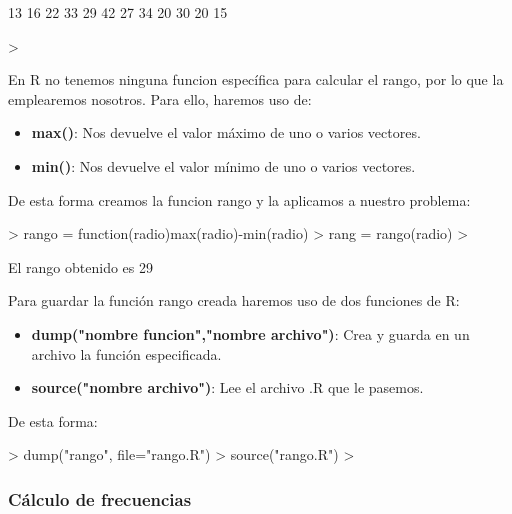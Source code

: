 \documentclass [a4paper] {article}
\begin{document}
\begin{Schunk}
\begin{Soutput}
 [1] 13 16 22 33 29 42 27 34 20 30 20 15
\end{Soutput}
\begin{Sinput}
> 
\end{Sinput}
\end{Schunk}
En R no tenemos ninguna funcion específica para calcular el rango, por lo que la emplearemos nosotros. Para ello, haremos uso de:
\begin{itemize}
	\item \textbf{max()}: Nos devuelve el valor máximo de uno o varios vectores.
	\item \textbf{min()}: Nos devuelve el valor mínimo de uno o varios vectores. 
																									 
\end{itemize}

De esta forma creamos la funcion rango y la aplicamos a nuestro problema:
\begin{Schunk}
\begin{Sinput}
> rango = function(radio){max(radio)-min(radio)}
> rang = rango(radio)
> 
\end{Sinput}
\end{Schunk}

El rango obtenido es 29

Para guardar la función rango creada haremos uso de dos funciones de R:
\begin{itemize}
	\item \textbf{dump("nombre funcion","nombre archivo")}: Crea y guarda en un archivo la función especificada.
	\item \textbf{source("nombre archivo")}: Lee el archivo .R que le pasemos.
																									 
\end{itemize}

De esta forma:
\begin{Schunk}
\begin{Sinput}
> dump("rango", file="rango.R")
> source("rango.R")
> 
\end{Sinput}
\end{Schunk}

\subsubsection{Cálculo de frecuencias}
\end{document}
